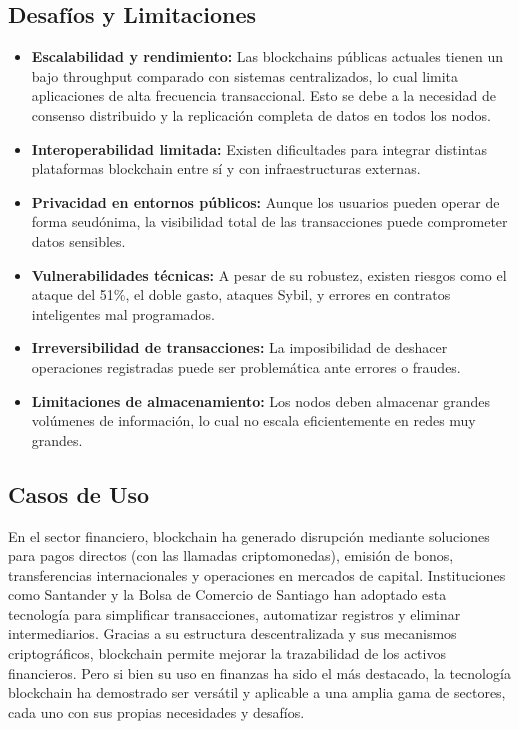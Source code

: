 \subsection{Desafíos y Limitaciones}

\begin{itemize}
    \item \textbf{Escalabilidad y rendimiento:} 
    Las blockchains públicas actuales tienen un bajo throughput comparado con sistemas centralizados, lo cual limita aplicaciones de alta frecuencia transaccional. Esto se debe a la necesidad de consenso distribuido y la replicación completa de datos en todos los nodos.

    \item \textbf{Interoperabilidad limitada:} 
    Existen dificultades para integrar distintas plataformas blockchain entre sí y con infraestructuras externas.

    \item \textbf{Privacidad en entornos públicos:} 
    Aunque los usuarios pueden operar de forma seudónima, la visibilidad total de las transacciones puede comprometer datos sensibles.

    \item \textbf{Vulnerabilidades técnicas:} 
    A pesar de su robustez, existen riesgos como el ataque del 51\%, el doble gasto, ataques Sybil, y errores en contratos inteligentes mal programados.

    \item \textbf{Irreversibilidad de transacciones:} 
    La imposibilidad de deshacer operaciones registradas puede ser problemática ante errores o fraudes.

    \item \textbf{Limitaciones de almacenamiento:} 
    Los nodos deben almacenar grandes volúmenes de información, lo cual no escala eficientemente en redes muy grandes.
\end{itemize}

\subsection{Casos de Uso}

En el sector financiero, blockchain ha generado disrupción mediante soluciones para pagos directos (con las llamadas criptomonedas), emisión de bonos, transferencias internacionales y operaciones en mercados de capital. Instituciones como Santander y la Bolsa de Comercio de Santiago han adoptado esta tecnología para simplificar transacciones, automatizar registros y eliminar intermediarios. Gracias a su estructura descentralizada y sus mecanismos criptográficos, blockchain permite mejorar la trazabilidad de los activos financieros. Pero si bien su uso en finanzas ha sido el más destacado, la tecnología blockchain ha demostrado ser versátil y aplicable a una amplia gama de sectores, cada uno con sus propias necesidades y desafíos.

